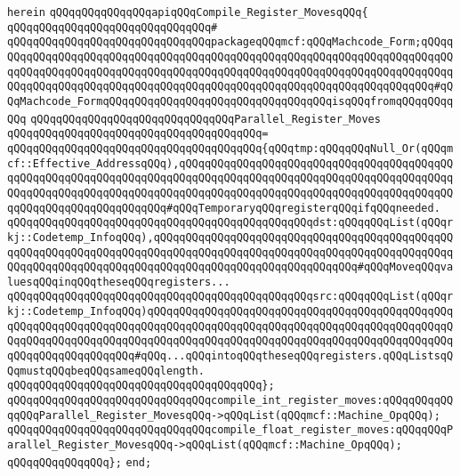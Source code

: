 \verb|herein|\newline
\newline
\verb|qQQqqQQqqQQqqQQqapiqQQqCompile_Register_MovesqQQq{|\newline
\verb|qQQqqQQqqQQqqQQqqQQqqQQqqQQqqQQq#|\newline
\verb|qQQqqQQqqQQqqQQqqQQqqQQqqQQqqQQqpackageqQQqmcf:qQQqMachcode_Form;qQQqqQQqqQQqqQQqqQQqqQQqqQQqqQQqqQQqqQQqqQQqqQQqqQQqqQQqqQQqqQQqqQQqqQQqqQQqqQQqqQQqqQQqqQQqqQQqqQQqqQQqqQQqqQQqqQQqqQQqqQQqqQQqqQQqqQQqqQQqqQQqqQQqqQQqqQQqqQQqqQQqqQQqqQQqqQQqqQQqqQQqqQQqqQQqqQQqqQQqqQQqqQQqqQQq#qQQqMachcode_FormqQQqqQQqqQQqqQQqqQQqqQQqqQQqqQQqqQQqisqQQqfromqQQqqQQqqQQq|\newline
\newline
\verb|qQQqqQQqqQQqqQQqqQQqqQQqqQQqqQQqParallel_Register_Moves|\newline
\verb|qQQqqQQqqQQqqQQqqQQqqQQqqQQqqQQqqQQqqQQq=|\newline
\verb|qQQqqQQqqQQqqQQqqQQqqQQqqQQqqQQqqQQqqQQq{qQQqtmp:qQQqqQQqNull_Or(qQQqmcf::Effective_AddressqQQq),qQQqqQQqqQQqqQQqqQQqqQQqqQQqqQQqqQQqqQQqqQQqqQQqqQQqqQQqqQQqqQQqqQQqqQQqqQQqqQQqqQQqqQQqqQQqqQQqqQQqqQQqqQQqqQQqqQQqqQQqqQQqqQQqqQQqqQQqqQQqqQQqqQQqqQQqqQQqqQQqqQQqqQQqqQQqqQQqqQQqqQQqqQQqqQQqqQQqqQQqqQQqqQQq#qQQqTemporaryqQQqregisterqQQqifqQQqneeded.|\newline
\verb|qQQqqQQqqQQqqQQqqQQqqQQqqQQqqQQqqQQqqQQqqQQqqQQqdst:qQQqqQQqList(qQQqrkj::Codetemp_InfoqQQq),qQQqqQQqqQQqqQQqqQQqqQQqqQQqqQQqqQQqqQQqqQQqqQQqqQQqqQQqqQQqqQQqqQQqqQQqqQQqqQQqqQQqqQQqqQQqqQQqqQQqqQQqqQQqqQQqqQQqqQQqqQQqqQQqqQQqqQQqqQQqqQQqqQQqqQQqqQQqqQQqqQQqqQQqqQQq#qQQqMoveqQQqvaluesqQQqinqQQqtheseqQQqregisters...|\newline
\verb|qQQqqQQqqQQqqQQqqQQqqQQqqQQqqQQqqQQqqQQqqQQqqQQqsrc:qQQqqQQqList(qQQqrkj::Codetemp_InfoqQQq)qQQqqQQqqQQqqQQqqQQqqQQqqQQqqQQqqQQqqQQqqQQqqQQqqQQqqQQqqQQqqQQqqQQqqQQqqQQqqQQqqQQqqQQqqQQqqQQqqQQqqQQqqQQqqQQqqQQqqQQqqQQqqQQqqQQqqQQqqQQqqQQqqQQqqQQqqQQqqQQqqQQqqQQqqQQqqQQqqQQqqQQqqQQqqQQqqQQqqQQqqQQqqQQq#qQQq...qQQqintoqQQqtheseqQQqregisters.qQQqListsqQQqmustqQQqbeqQQqsameqQQqlength.|\newline
\verb|qQQqqQQqqQQqqQQqqQQqqQQqqQQqqQQqqQQqqQQq};|\newline
\newline
\verb|qQQqqQQqqQQqqQQqqQQqqQQqqQQqqQQqcompile_int_register_moves:qQQqqQQqqQQqqQQqParallel_Register_MovesqQQq->qQQqList(qQQqmcf::Machine_OpqQQq);|\newline
\verb|qQQqqQQqqQQqqQQqqQQqqQQqqQQqqQQqcompile_float_register_moves:qQQqqQQqParallel_Register_MovesqQQq->qQQqList(qQQqmcf::Machine_OpqQQq);|\newline
\verb|qQQqqQQqqQQqqQQq};|\newline
\verb|end;|\newline


